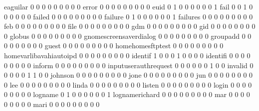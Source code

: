 \documentclass[compress,8pt]{beamer}
\begin{document}
\begin{frame}
\begin{Schunk}
  eaguilar                                   0   0   0   0   0   0   0   0   0
  error                                      0   0   0   0   0   0   0   0   0
  euid                                       0   1   0   0   0   0   0   0   1
  fail                                       0   0   1   0   0   0   0   0   0
  failed                                     0   0   0   0   0   0   0   0   0
  failure                                    0   1   0   0   0   0   0   0   1
  failures                                   0   0   0   0   0   0   0   0   0
  feb                                        0   0   0   0   0   0   0   0   0
  file                                       0   0   0   0   0   0   0   0   0
  gdm                                        0   0   0   0   0   0   0   0   0
  gid                                        0   0   0   0   0   0   0   0   0
  globus                                     0   0   0   0   0   0   0   0   0
  gnomescreensaverdialog                     0   0   0   0   0   0   0   0   0
  groupadd                                   0   0   0   0   0   0   0   0   0
  guest                                      0   0   0   0   0   0   0   0   0
  homehomesftptest                           0   0   0   0   0   0   0   0   0
  homevarlibavahiautoipd                     0   0   0   0   0   0   0   0   0
  identif                                    1   0   0   0   1   0   0   0   0
  identifi                                   0   0   0   0   0   0   0   0   0
  inform                                     0   0   0   0   0   0   0   0   0
  inputuserauthrequest                       0   0   0   0   0   0   1   0   0
  invalid                                    0   0   0   0   0   1   1   0   0
  johnson                                    0   0   0   0   0   0   0   0   0
  jone                                       0   0   0   0   0   0   0   0   0
  jun                                        0   0   0   0   0   0   0   0   0
  lee                                        0   0   0   0   0   0   0   0   0
  linda                                      0   0   0   0   0   0   0   0   0
  listen                                     0   0   0   0   0   0   0   0   0
  login                                      0   0   0   0   0   0   0   0   0
  logname                                    0   1   0   0   0   0   0   0   1
  lognamerichard                             0   0   0   0   0   0   0   0   0
  mar                                        0   0   0   0   0   0   0   0   0
  mari                                       0   0   0   0   0   0   0   0   0

\end{Schunk}
\end{frame}
\end{document}
